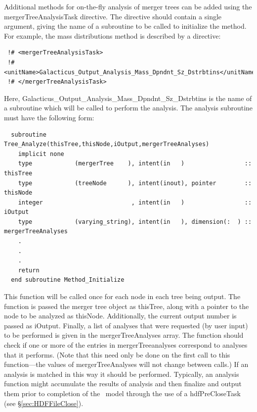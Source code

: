 Additional methods for on-the-fly analysis of merger trees can be added using the {\normalfont \ttfamily mergerTreeAnalysisTask} directive. The directive should contain a single argument, giving the name of a subroutine to be called to initialize the method. For example, the mass distributions method is described by a directive:
\begin{verbatim}
 !# <mergerTreeAnalysisTask>
 !#  <unitName>Galacticus_Output_Analysis_Mass_Dpndnt_Sz_Dstrbtins</unitName>
 !# </mergerTreeAnalysisTask>
\end{verbatim}
Here, {\normalfont \ttfamily Galacticus\_Output\_Analysis\_Mass\_Dpndnt\_Sz\_Dstrbtins} is the name of a subroutine which will be called to perform the analysis. The analysis subroutine must have the following form:
\begin{verbatim}
  subroutine Tree_Analyze(thisTree,thisNode,iOutput,mergerTreeAnalyses)
    implicit none
    type            (mergerTree    ), intent(in   )                 :: thisTree
    type            (treeNode      ), intent(inout), pointer        :: thisNode
    integer                         , intent(in   )                 :: iOutput
    type            (varying_string), intent(in   ), dimension(:  ) :: mergerTreeAnalyses
    .
    .
    .
    return
  end subroutine Method_Initialize
\end{verbatim}
This function will be called once for each node in each tree being output. The function is passed the merger tree object as {\normalfont \ttfamily thisTree}, along with a pointer to the node to be analyzed as {\normalfont \ttfamily thisNode}. Additionally, the current output number is passed as {\normalfont \ttfamily iOutput}. Finally, a list of analyses that were requested (by user input) to be performed is given in the {\normalfont \ttfamily mergerTreeAnalyses} array. The function should check if one or more of the entries in {\normalfont \ttfamily mergerTreeanalyses} correspond to analyses that it performs. (Note that this need only be done on the first call to this function---the values of {\normalfont \ttfamily mergerTreeAnalyses} will not change between calls.) If an analysis is matched in this way it should be performed. Typically, an analysis function might accumulate the results of analysis and then finalize and output them prior to completion of the \glc\ model through the use of a {\normalfont \ttfamily hdfPreCloseTask} (see \S\ref{sec:HDFFileClose}).

